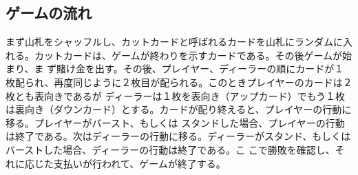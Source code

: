 \subsection{ゲームの流れ}
まず山札をシャッフルし、カットカードと呼ばれるカードを山札にランダムに入れる。カットカードは、ゲームが終わりを示すカードである。その後ゲームが始まり、ま
ず賭け金を出す。その後、プレイヤー、ディーラーの順にカードが１枚配られ、再度同じように２枚目が配られる。このときプレイヤーのカードは２枚とも表向きであるが
ディーラーは１枚を表向き（アップカード）でもう１枚は裏向き（ダウンカード）とする。カードが配り終えると、プレイヤーの行動に移る。プレイヤーがバースト、もしくは
スタンドした場合、プレイヤーの行動は終了である。次はディーラーの行動に移る。ディーラーがスタンド、もしくはバーストした場合、ディーラーの行動は終了である。こ
こで勝敗を確認し、それに応じた支払いが行われて、ゲームが終了する。